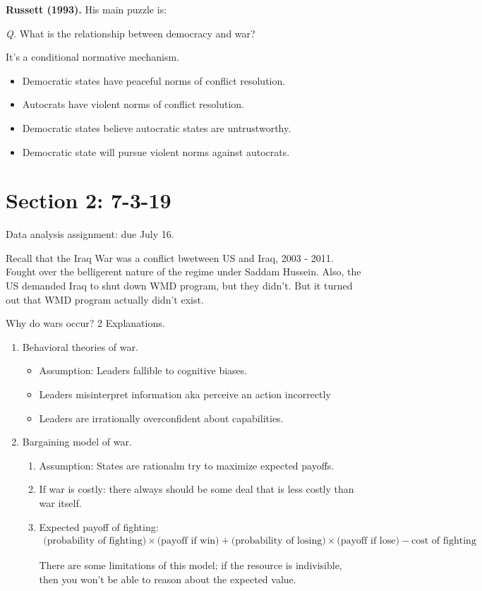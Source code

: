 \documentclass{article}
\begin{document}
{\bf Russett (1993).} His main puzzle is:

{\it Q.} What is the relationship between democracy and war?

It's a conditional normative mechanism.

\begin{itemize}
  \item Democratic states have peaceful norms of conflict resolution.
  \item Autocrats have violent norms of conflict resolution.
  \item Democratic states believe autocratic states are untrustworthy.
  \item Democratic state will pursue violent norms against autocrats.
\end{itemize}

\section{Section 2: 7-3-19}

Data analysis assignment: due July 16.

Recall that the Iraq War was a conflict bwetween US and Iraq, 2003 - 2011.  Fought over the belligerent nature of the regime under Saddam Hussein.  Also, the US demanded Iraq to shut down WMD program, but they didn't.  But it turned out that WMD program actually didn't exist.

Why do wars occur? 2 Explanations.

\begin{enumerate}
  \item Behavioral theories of war.
    \begin{itemize}
      \item Assumption: Leaders fallible to cognitive biases.
      \item Leaders misinterpret information aka perceive an action incorrectly
      \item Leaders are irrationally overconfident about capabilities.
    \end{itemize}
  \item Bargaining model of war.
    \begin{enumerate}
      \item Assumption: States are rationalm try to maximize expected payoffs.
      \item If war is costly: there always should be some deal that is less costly than war itself.
      \item Expected payoff of fighting:
        \begin{align*}
          \text{(probability of fighting)} \times \text{(payoff if win)} + \text{(probability of losing)} \times \text{(payoff if lose)} - \text{cost of fighting}
        \end{align*}

        There are some limitations of this model; if the resource is indivisible, then you won't be able to reason about the expected value.
    \end{enumerate}
\end{enumerate}
\end{document}
